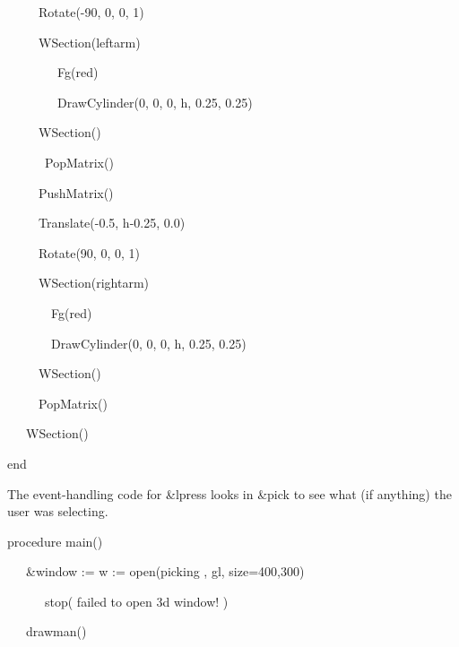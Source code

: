 \documentclass[letterpaper]{article}
\begin{document}
{\sffamily
\ \ \ \ \  Rotate(-90, 0, 0, 1)}

{\sffamily
\ \ \ \ \  WSection({\textquotedbl}leftarm{\textquotedbl})}

{\sffamily
\ \ \ \ \  \ \ \ Fg({\textquotedbl}red{\textquotedbl})}

{\sffamily
\ \ \ \ \  \ \ \ DrawCylinder(0, 0, 0, h, 0.25, 0.25)}

{\sffamily
\ \ \ \ \  WSection()}

{\sffamily
\ \ \ \ \ \ PopMatrix()}

{\sffamily
\ \ \ \ \ PushMatrix()}

{\sffamily
\ \ \ \ \ Translate(-0.5, h-0.25, 0.0)}

{\sffamily
\ \ \ \ \ Rotate(90, 0, 0, 1)}

{\sffamily
\ \ \ \ \ WSection({\textquotedbl}rightarm{\textquotedbl})}

{\sffamily
\ \ \ \ \  \ \ Fg({\textquotedbl}red{\textquotedbl})}

{\sffamily
\ \ \ \ \  \ \ DrawCylinder(0, 0, 0, h, 0.25, 0.25)}

{\sffamily
\ \ \ \ \ WSection()}

{\sffamily
\ \ \ \ \ PopMatrix()}

{\sffamily
\ \ \ WSection()}

{\sffamily
end}


\bigskip

{
The event-handling code for \textsf{\&lpress} looks in \textsf{\&pick} to see what (if anything) the user was
selecting.}


\bigskip

{\sffamily
procedure main()}

{\sffamily
\ \ \ \&window := w := open({\textquotedbl}picking{\textquotedbl} , {\textquotedbl}gl{\textquotedbl},
{\textquotedbl}size=400,300{\textquotedbl}) {\textbar}}

{\sffamily
\ \ \ \ \ \ stop({\textquotedbl} failed to open 3d window! {\textquotedbl})}

{\sffamily
\ \ \ drawman()}
\end{document}
